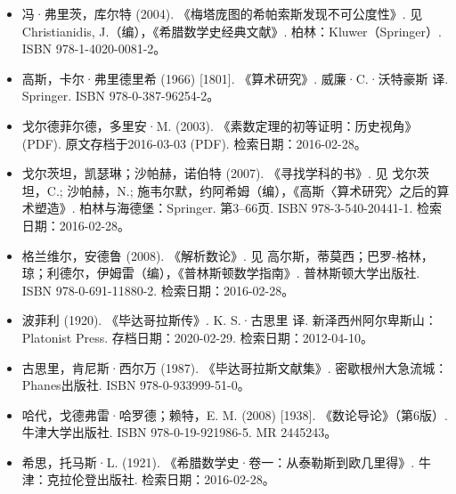 \begin{itemize}
\item 冯·弗里茨，库尔特 (2004). 《梅塔庞图的希帕索斯发现不可公度性》. 见 Christianidis, J.（编），《希腊数学史经典文献》. 柏林：Kluwer（Springer）. ISBN 978-1-4020-0081-2。
\item 高斯，卡尔·弗里德里希 (1966) [1801]. 《算术研究》. 威廉·C.·沃特豪斯 译. Springer. ISBN 978-0-387-96254-2。
\item 戈尔德菲尔德，多里安·M. (2003). 《素数定理的初等证明：历史视角》 (PDF). 原文存档于2016-03-03 (PDF). 检索日期：2016-02-28。
\item 戈尔茨坦，凯瑟琳；沙帕赫，诺伯特 (2007). 《寻找学科的书》. 见 戈尔茨坦，C.; 沙帕赫，N.; 施韦尔默，约阿希姆（编），《高斯〈算术研究〉之后的算术塑造》. 柏林与海德堡：Springer. 第3–66页. ISBN 978-3-540-20441-1. 检索日期：2016-02-28。
\item 格兰维尔，安德鲁 (2008). 《解析数论》. 见 高尔斯，蒂莫西；巴罗-格林，琼；利德尔，伊姆雷（编），《普林斯顿数学指南》. 普林斯顿大学出版社. ISBN 978-0-691-11880-2. 检索日期：2016-02-28。
\item 波菲利 (1920). 《毕达哥拉斯传》. K. S.·古思里 译. 新泽西州阿尔卑斯山：Platonist Press. 存档日期：2020-02-29. 检索日期：2012-04-10。
\item 古思里，肯尼斯·西尔万 (1987). 《毕达哥拉斯文献集》. 密歇根州大急流城：Phanes出版社. ISBN 978-0-933999-51-0。
\item 哈代，戈德弗雷·哈罗德；赖特，E. M. (2008) [1938]. 《数论导论》（第6版）. 牛津大学出版社. ISBN 978-0-19-921986-5. MR 2445243。
\item 希思，托马斯·L. (1921). 《希腊数学史·卷一：从泰勒斯到欧几里得》. 牛津：克拉伦登出版社. 检索日期：2016-02-28。

\end{itemize}